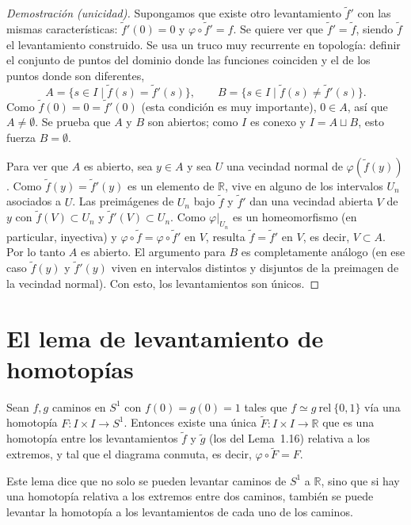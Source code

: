 \documentclass[11pt]{article}
\begin{document}
\begin{proof}[Demostración (unicidad)]
Supongamos que existe otro levantamiento $\tilde f'$ con las mismas características: $\tilde f'(0)=0$ y $\varphi\circ\tilde f'=f$. Se quiere ver que $\tilde f'=\tilde f$, siendo $\tilde f$ el levantamiento construido. Se usa un truco muy recurrente en topología: definir el conjunto de puntos del dominio donde las funciones coinciden y el de los puntos donde son diferentes,
\[
  A=\{s\in I\mid \tilde f(s)=\tilde f'(s)\},
  \qquad
  B=\{s\in I\mid \tilde f(s)\neq\tilde f'(s)\}.
\]
Como $\tilde f(0)=0=\tilde f'(0)$ (esta condición es muy importante), $0\in A$, así que $A\neq\emptyset$. Se prueba que $A$ y $B$ son abiertos; como $I$ es conexo y $I=A\sqcup B$, esto fuerza $B=\emptyset$.

Para ver que $A$ es abierto, sea $y\in A$ y sea $U$ una vecindad normal de $\varphi(\tilde f(y))$. Como $\tilde f(y)=\tilde f'(y)$ es un elemento de $\mathbb{R}$, vive en alguno de los intervalos $U_n$ asociados a $U$. Las preimágenes de $U_n$ bajo $\tilde f$ y $\tilde f'$ dan una vecindad abierta $V$ de $y$ con $\tilde f(V)\subset U_n$ y $\tilde f'(V)\subset U_n$. Como $\varphi|_{U_n}$ es un homeomorfismo (en particular, inyectiva) y $\varphi\circ\tilde f=\varphi\circ\tilde f'$ en $V$, resulta $\tilde f=\tilde f'$ en $V$, es decir, $V\subset A$. Por lo tanto $A$ es abierto. El argumento para $B$ es completamente análogo (en ese caso $\tilde f(y)$ y $\tilde f'(y)$ viven en intervalos distintos y disjuntos de la preimagen de la vecindad normal). Con esto, los levantamientos son únicos.
\end{proof}

\section*{El lema de levantamiento de homotopías}

\begin{lema}
Sean $f,g$ caminos en $S^1$ con $f(0)=g(0)=1$ tales que $f\simeq g\ \mathrm{rel}\ \{0,1\}$ vía una homotopía $F\colon I\times I\to S^1$. Entonces existe una única $\tilde F\colon I\times I\to\mathbb{R}$ que es una homotopía entre los levantamientos $\tilde f$ y $\tilde g$ (los del Lema~1.16) relativa a los extremos, y tal que el diagrama conmuta, es decir, $\varphi\circ\tilde F=F$.
\end{lema}

Este lema dice que no solo se pueden levantar caminos de $S^1$ a $\mathbb{R}$, sino que si hay una homotopía relativa a los extremos entre dos caminos, también se puede levantar la homotopía a los levantamientos de cada uno de los caminos.
\end{document}
